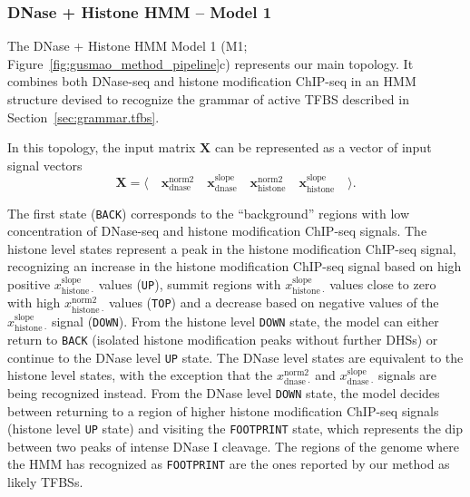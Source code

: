 \subsubsection{DNase + Histone HMM -- Model 1}

The DNase + Histone HMM Model 1 (M1; Figure~\ref{fig:gusmao_method_pipeline}c) represents our main topology. It combines both DNase-seq and histone modification ChIP-seq in an HMM structure devised to recognize the grammar of active TFBS described in Section~\ref{sec:grammar.tfbs}.

In this topology, the input matrix $\mathbf{X}$ can be represented as a vector of input signal vectors
\begin{equation}
  \label{eq:signal.m1}
  \mathbf{X} = \langle \quad \mathbf{x}^{\text{norm2}}_{\text{dnase}} \quad \mathbf{x}^{\text{slope}}_{\text{dnase}} \quad \mathbf{x}^{\text{norm2}}_{\text{histone}} \quad \mathbf{x}^{\text{slope}}_{\text{histone}} \quad \rangle .
\end{equation}

The first state ({\tt BACK}) corresponds to the ``background'' regions with low concentration of DNase-seq and histone modification ChIP-seq signals. The histone level states represent a peak in the histone modification ChIP-seq signal, recognizing an increase in the histone modification ChIP-seq signal based on high positive $x^{\text{slope}}_{\text{histone}\ \cdot}$ values ({\tt UP}), summit regions with $x^{\text{slope}}_{\text{histone}\ \cdot}$ values close to zero with high $x^{\text{norm2}}_{\text{histone}\ \cdot}$ values ({\tt TOP}) and a decrease based on negative values of the $x^{\text{slope}}_{\text{histone}\ \cdot}$ signal ({\tt DOWN}). From the histone level {\tt DOWN} state, the model can either return to {\tt BACK} (isolated histone modification peaks without further DHSs) or continue to the DNase level {\tt UP} state. The DNase level states are equivalent to the histone level states, with the exception that the $x^{\text{norm2}}_{\text{dnase}\ \cdot}$ and $x^{\text{slope}}_{\text{dnase}\ \cdot}$ signals are being recognized instead. From the DNase level {\tt DOWN} state, the model decides between returning to a region of higher histone modification ChIP-seq signals (histone level {\tt UP} state) and visiting the {\tt FOOTPRINT} state, which represents the dip between two peaks of intense DNase I cleavage. The regions of the genome where the HMM has recognized as {\tt FOOTPRINT} are the ones reported by our method as likely TFBSs.

